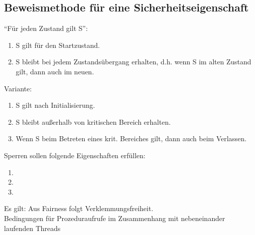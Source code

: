 \subsection*{Beweismethode für eine Sicherheitseigenschaft}
"`Für jeden Zustand gilt S"':
\begin{enumerate}
\item S gilt für den Startzustand.
\item S bleibt bei jedem Zustandsübergang erhalten, d.h. wenn S im alten Zustand gilt, dann auch im neuen.
\end{enumerate}
Variante:
\begin{enumerate}
\item S gilt nach Initialisierung.
\item S bleibt außerhalb von kritischen Bereich erhalten.
\item Wenn S beim Betreten eines krit. Bereiches gilt, dann auch beim Verlassen.
\end{enumerate}
Sperren sollen folgende Eigenschaften erfüllen:
\begin{enumerate}
\item
\item
\item
\end{enumerate}
Es gilt: Aus Fairness folgt Verklemmungsfreiheit.
\\
Bedingungen für Prozeduraufrufe im Zusammenhang mit nebeneinander laufenden Threads
